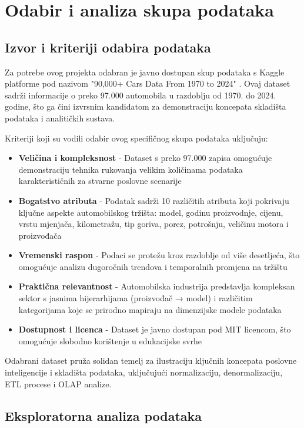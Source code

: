 \section{Odabir i analiza skupa podataka}

\subsection{Izvor i kriteriji odabira podataka}

Za potrebe ovog projekta odabran je javno dostupan skup podataka s Kaggle platforme pod nazivom "90,000+ Cars Data From 1970 to 2024" \cite{KaggleDataset2024}. Ovaj dataset sadrži informacije o preko 97.000 automobila u razdoblju od 1970. do 2024. godine, što ga čini izvrsnim kandidatom za demonstraciju koncepata skladišta podataka i analitičkih sustava.

Kriteriji koji su vodili odabir ovog specifičnog skupa podataka uključuju:

\begin{itemize}
    \item \textbf{Veličina i kompleksnost} - Dataset s preko 97.000 zapisa omogućuje demonstraciju tehnika rukovanja velikim količinama podataka karakterističnih za stvarne poslovne scenarije
    \item \textbf{Bogatstvo atributa} - Podatak sadrži 10 različitih atributa koji pokrivaju ključne aspekte automobilskog tržišta: model, godinu proizvodnje, cijenu, vrstu mjenjača, kilometražu, tip goriva, porez, potrošnju, veličinu motora i proizvođača
    \item \textbf{Vremenski raspon} - Podaci se protežu kroz razdoblje od više desetljeća, što omogućuje analizu dugoročnih trendova i temporalnih promjena na tržištu
    \item \textbf{Praktična relevantnost} - Automobilska industrija predstavlja kompleksan sektor s jasnima hijerarhijama (proizvođač → model) i različitim kategorijama koje se prirodno mapiraju na dimenzijske modele podataka
    \item \textbf{Dostupnost i licenca} - Dataset je javno dostupan pod MIT licencom, što omogućuje slobodno korištenje u edukacijske svrhe
\end{itemize}

Odabrani dataset pruža solidan temelj za ilustraciju ključnih koncepata poslovne inteligencije i skladišta podataka, uključujući normalizaciju, denormalizaciju, ETL procese i OLAP analize.

\subsection{Eksploratorna analiza podataka}

